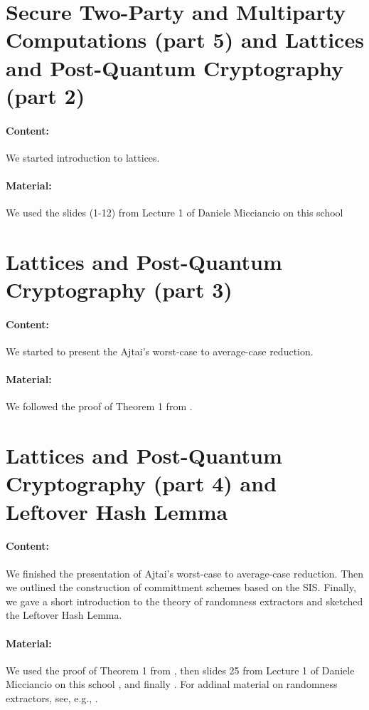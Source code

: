 \documentclass{llncs}
\begin{document}
\section{Secure Two-Party and Multiparty Computations (part 5) and Lattices and Post-Quantum Cryptography (part 2)}

\paragraph{Content:} We started introduction to lattices. 

\paragraph{Material:} We used the slides (1-12) from Lecture 1 of Daniele Micciancio on this school \cite{PQC}

\section{Lattices and Post-Quantum Cryptography (part 3)}

\paragraph{Content:} We started to present the Ajtai's worst-case to average-case reduction.

\paragraph{Material:} We followed the proof of Theorem 1 from \cite{Goldreich2011}.

\section{Lattices and Post-Quantum Cryptography (part 4) and Leftover Hash Lemma}

\paragraph{Content:} We finished the presentation of Ajtai's worst-case to average-case reduction. Then we outlined the construction of committment schemes based on the SIS. Finally, we gave a short introduction to the theory of randomness extractors and sketched the Leftover Hash Lemma. 

\paragraph{Material:} We used the proof of Theorem 1 from \cite{Goldreich2011}, then slides 25 from Lecture 1 of Daniele Micciancio on this school \cite{PQC}, and finally \cite{leo}. For addinal material on randomness extractors, see, e.g., \cite{Shaltiel2011}.


\printbibliography %
\end{document}
